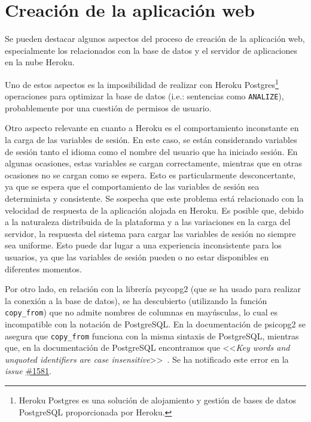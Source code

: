 \section{Creación de la aplicación web}

Se pueden destacar algunos aspectos del proceso de creación de la aplicación web, especialmente los relacionados con la base de datos y el servidor de aplicaciones en la nube Heroku. 

Uno de estos aspectos es la imposibilidad de realizar con Heroku Postgres\footnote{Heroku Postgres es una solución de alojamiento y gestión de bases de datos PostgreSQL proporcionada por Heroku.} operaciones para optimizar la base de datos (i.e.: sentencias como \texttt{ANALIZE}), probablemente por una cuestión de permisos de usuario.

Otro aspecto relevante en cuanto a Heroku es el comportamiento inconstante en la carga de las variables de sesión. En este caso, se están considerando variables de sesión tanto el idioma como el nombre del usuario que ha iniciado sesión. En algunas ocasiones, estas variables se cargan correctamente, mientras que en otras ocasiones no se cargan como se espera. Esto es particularmente desconcertante, ya que se espera que el comportamiento de las variables de sesión sea determinista y consistente. Se sospecha que este problema está relacionado con la velocidad de respuesta de la aplicación alojada en Heroku. Es posible que, debido a la naturaleza distribuida de la plataforma y a las variaciones en la carga del servidor, la respuesta del sistema para cargar las variables de sesión no siempre sea uniforme. Esto puede dar lugar a una experiencia inconsistente para los usuarios, ya que las variables de sesión pueden o no estar disponibles en diferentes momentos.

Por otro lado, en relación con la librería psycopg2 (que se ha usado para realizar la conexión a la base de datos), se ha descubierto (utilizando la función \texttt{copy\_from}) que no admite nombres de columnas en mayúsculas, lo cual es incompatible con la notación de PostgreSQL. En la documentación de psicopg2 se asegura que \texttt{copy\_from} funciona con la misma sintaxis de PostgreSQL, mientras que, en la documentación de PostgreSQL encontramos que <<\textit{Key words and unquoted identifiers are case insensitive}>>~\cite{bug}. Se ha notificado este error en la \textit{issue} \href{https://github.com/psycopg/psycopg2/issues/1581}{\#1581}.









